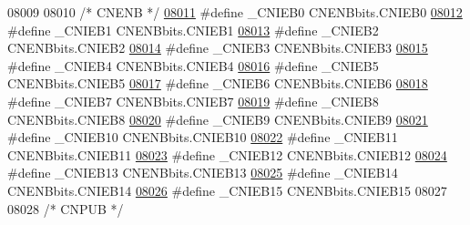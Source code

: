 \begin{DoxyCode}
08009 
08010 \textcolor{comment}{/* CNENB */}
\hypertarget{a00015_source_l08011}{}\hyperlink{a00015_a64b062bf600bd96f16cf1708ac540e03}{08011} \textcolor{preprocessor}{#define \_CNIEB0 CNENBbits.CNIEB0}
\hypertarget{a00015_source_l08012}{}\hyperlink{a00015_a824653e72db22bdd658f44daaf34c587}{08012} \textcolor{preprocessor}{#define \_CNIEB1 CNENBbits.CNIEB1}
\hypertarget{a00015_source_l08013}{}\hyperlink{a00015_ac4a79a9ad014bebd7b1a77416b104085}{08013} \textcolor{preprocessor}{#define \_CNIEB2 CNENBbits.CNIEB2}
\hypertarget{a00015_source_l08014}{}\hyperlink{a00015_ab2a9550cbb5ee4fed0cebb3700bf1519}{08014} \textcolor{preprocessor}{#define \_CNIEB3 CNENBbits.CNIEB3}
\hypertarget{a00015_source_l08015}{}\hyperlink{a00015_ad28a8026c6014a54e421474fbecda145}{08015} \textcolor{preprocessor}{#define \_CNIEB4 CNENBbits.CNIEB4}
\hypertarget{a00015_source_l08016}{}\hyperlink{a00015_af1609dec4312e7ef987b963643f3fca2}{08016} \textcolor{preprocessor}{#define \_CNIEB5 CNENBbits.CNIEB5}
\hypertarget{a00015_source_l08017}{}\hyperlink{a00015_a79a43b4a19cbbccfc2146ccb1b02f4ec}{08017} \textcolor{preprocessor}{#define \_CNIEB6 CNENBbits.CNIEB6}
\hypertarget{a00015_source_l08018}{}\hyperlink{a00015_a2aae9c5a213fd9a35a440906a7d824c8}{08018} \textcolor{preprocessor}{#define \_CNIEB7 CNENBbits.CNIEB7}
\hypertarget{a00015_source_l08019}{}\hyperlink{a00015_a6fb5baec53bd683ad14917373f26404d}{08019} \textcolor{preprocessor}{#define \_CNIEB8 CNENBbits.CNIEB8}
\hypertarget{a00015_source_l08020}{}\hyperlink{a00015_a3e261f16da5f96912ee02fe35b5d6b28}{08020} \textcolor{preprocessor}{#define \_CNIEB9 CNENBbits.CNIEB9}
\hypertarget{a00015_source_l08021}{}\hyperlink{a00015_a7145d5104763093c1865ed3fe62a50d4}{08021} \textcolor{preprocessor}{#define \_CNIEB10 CNENBbits.CNIEB10}
\hypertarget{a00015_source_l08022}{}\hyperlink{a00015_ac13a423b158dcc59bae61d33fdd5344a}{08022} \textcolor{preprocessor}{#define \_CNIEB11 CNENBbits.CNIEB11}
\hypertarget{a00015_source_l08023}{}\hyperlink{a00015_a660ac02e2265bbc309c1e65606c232d4}{08023} \textcolor{preprocessor}{#define \_CNIEB12 CNENBbits.CNIEB12}
\hypertarget{a00015_source_l08024}{}\hyperlink{a00015_abfab18d208f717b85be4471bf84a40d4}{08024} \textcolor{preprocessor}{#define \_CNIEB13 CNENBbits.CNIEB13}
\hypertarget{a00015_source_l08025}{}\hyperlink{a00015_ab7beb22cb1be703a06f6465400bed643}{08025} \textcolor{preprocessor}{#define \_CNIEB14 CNENBbits.CNIEB14}
\hypertarget{a00015_source_l08026}{}\hyperlink{a00015_ab9a8320a41c53b87737d342631c38044}{08026} \textcolor{preprocessor}{#define \_CNIEB15 CNENBbits.CNIEB15}
08027 
08028 \textcolor{comment}{/* CNPUB */}

\end{DoxyCode}
